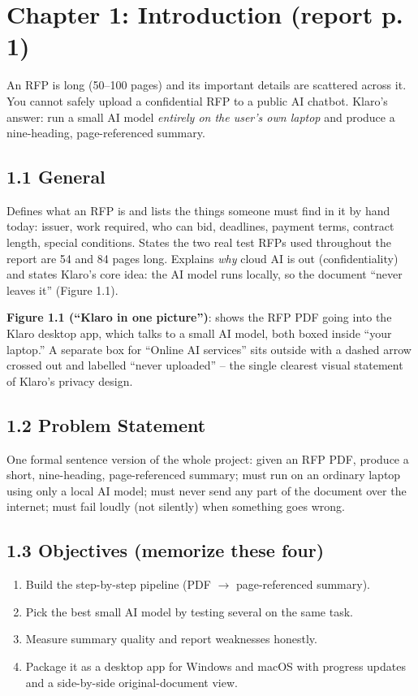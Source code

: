 \documentclass[11pt,a4paper]{article}
\begin{document}
\newpage
\section{Chapter 1: Introduction (report p. 1)}

\begin{bigpicture}
An RFP is long (50--100 pages) and its important details are scattered across it. You cannot safely
upload a confidential RFP to a public AI chatbot. Klaro's answer: run a small AI model
\emph{entirely on the user's own laptop} and produce a nine-heading, page-referenced summary.
\end{bigpicture}

\subsection*{1.1 General}
Defines what an RFP is and lists the things someone must find in it by hand today: issuer, work
required, who can bid, deadlines, payment terms, contract length, special conditions. States the two
real test RFPs used throughout the report are 54 and 84 pages long. Explains \emph{why} cloud AI is
out (confidentiality) and states Klaro's core idea: the AI model runs locally, so the document
``never leaves it'' (Figure 1.1).

\textbf{Figure 1.1 (``Klaro in one picture'')}: shows the RFP PDF going into the Klaro desktop app,
which talks to a small AI model, both boxed inside ``your laptop.'' A separate box for ``Online AI
services'' sits outside with a dashed arrow crossed out and labelled ``never uploaded'' -- the single
clearest visual statement of Klaro's privacy design.

\subsection*{1.2 Problem Statement}
One formal sentence version of the whole project: given an RFP PDF, produce a short, nine-heading,
page-referenced summary; must run on an ordinary laptop using only a local AI model; must never send
any part of the document over the internet; must fail loudly (not silently) when something goes
wrong.

\subsection*{1.3 Objectives (memorize these four)}
\begin{enumerate}[leftmargin=1.4cm]
  \item Build the step-by-step pipeline (PDF $\to$ page-referenced summary).
  \item Pick the best small AI model by testing several on the same task.
  \item Measure summary quality and report weaknesses honestly.
  \item Package it as a desktop app for Windows and macOS with progress updates and a side-by-side
    original-document view.
\end{enumerate}
\end{document}
